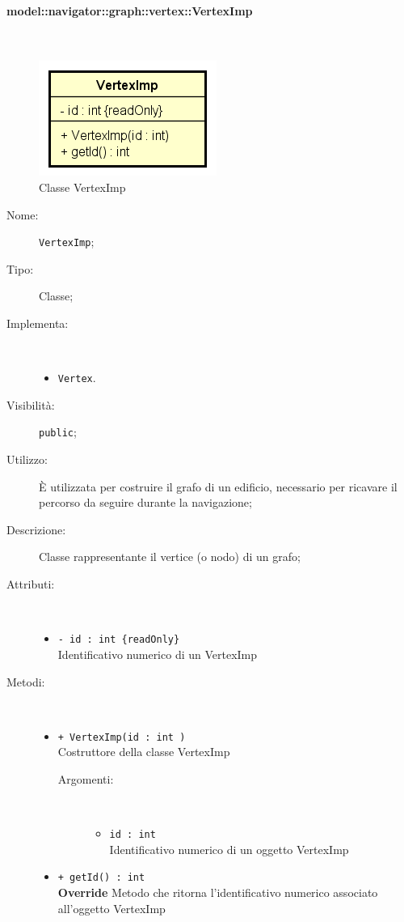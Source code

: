 \documentclass[../DefinizioneDiProdotto.tex]{subfiles}
\begin{document}
\paragraph{model::navigator::graph::vertex::VertexImp}
\
\begin{figure}[H]
	\centering
	\includegraphics[width=\maxwidth]{img/VertexImp.png}
	\caption{Classe VertexImp}\label{fig:model::navigator::graph::vertex::VertexImp} 
\end{figure}
\begin{description}
	\item[Nome:] \texttt{VertexImp};
	\item[Tipo:] Classe;
	\item[Implementa:] \
	\begin{itemize}
		\item \texttt{Vertex}.
		
	\end{itemize}
	\item[Visibilità:] \texttt{public};
	\item[Utilizzo:] È utilizzata per costruire il grafo di un edificio, necessario per ricavare il percorso da seguire durante la navigazione;
	\item[Descrizione:] Classe rappresentante il vertice (o nodo) di un grafo;
	\item[Attributi:] \
	\begin{itemize}
		\item \texttt{- id : int \{readOnly\}}\\
		Identificativo numerico di un VertexImp
		
	\end{itemize}
	\item[Metodi:] \
	\begin{itemize}
		\item \texttt{+ VertexImp(id : int )}\\
		Costruttore della classe VertexImp
		\begin{description}
			\item[Argomenti:] \
			\begin{itemize}
				\item \texttt{id : int }\\
				Identificativo numerico di un oggetto VertexImp\end{itemize}
		\end{description}
		\item \texttt{+ getId() : int}\\
		\textbf{Override} Metodo che ritorna l'identificativo numerico associato all'oggetto VertexImp
	\end{itemize}
\end{description}
\end{document}
